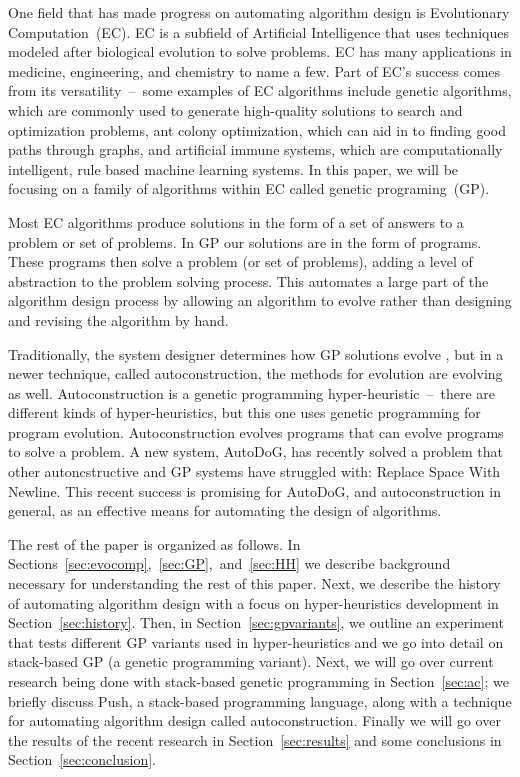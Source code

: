 \documentclass{sig-alternate}
\begin{document}
One field that has made progress on automating algorithm design is Evolutionary Computation~(EC). EC is a subfield of Artificial Intelligence that uses techniques modeled after biological evolution to solve problems. EC has many applications in medicine, engineering, and chemistry to name a few. Part of EC's success comes from its versatility~--~some examples of EC algorithms include genetic algorithms, which are commonly used to generate high-quality solutions to search and optimization problems, ant colony optimization, which can aid in to finding good paths through graphs, and artificial immune systems, which are computationally intelligent, rule based machine learning systems. In this paper, we will be focusing on a family of algorithms within EC called genetic programing~(GP).

Most EC algorithms produce solutions in the form of a set of answers to a problem or set of problems. In GP our solutions are in the form of programs. These programs then solve a problem (or set of problems), adding a level of abstraction to the problem solving process. This automates a large part of the algorithm design process by allowing an algorithm to evolve rather than designing and revising the algorithm by hand.

Traditionally, the system designer determines how GP solutions evolve \cite{spector:2016}, but in a newer technique, called autoconstruction, the methods for evolution are evolving as well. Autoconstruction is a genetic programming hyper-heuristic~--~there are different kinds of hyper-heuristics, but this one uses genetic programming for program evolution. Autoconstruction evolves programs that can evolve programs to solve a problem. A new system, AutoDoG, has recently solved a problem that other autoncstructive and GP systems have struggled with: Replace Space With Newline. This recent success is promising for AutoDoG, and autoconstruction in general, as an effective means for automating the design of algorithms.

The rest of the paper is organized as follows. In Sections~\ref{sec:evocomp},~\ref{sec:GP},~and~\ref{sec:HH} we describe background necessary for understanding the rest of this paper. Next, we describe the history of automating algorithm design with a focus on hyper-heuristics development in Section~\ref{sec:history}. Then, in Section~\ref{sec:gpvariants}, we outline an experiment that tests different GP variants used in hyper-heuristics and we go into detail on stack-based GP (a genetic programming variant). Next, we will go over current research being done with stack-based genetic programming in Section~\ref{sec:ac}; we briefly discuss Push, a stack-based programming language, along with a technique for automating algorithm design called autoconstruction. Finally we will go over the results of the recent research in Section~\ref{sec:results} and some conclusions in Section~\ref{sec:conclusion}.
\end{document}
